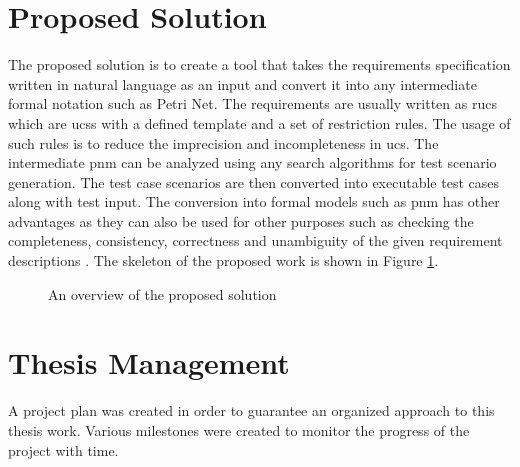 \section{Proposed Solution}
The proposed solution is to create a tool that takes the requirements specification written in natural language as an input and convert it into any intermediate formal notation such as Petri Net. The requirements are usually written as \gls{rucs} which are \glspl{ucs} with a defined template and a set of restriction rules. The usage of such rules is to reduce the imprecision and incompleteness in \gls{ucs}. The intermediate \gls{pnm} can be analyzed using any search algorithms for test scenario generation. The test case scenarios are then converted into executable test cases along with test input. The conversion into formal models such as \gls{pnm} has other advantages as they can also be used for other purposes such as checking the completeness, consistency, correctness and unambiguity of the given requirement descriptions \cite{sarmiento2015analysis}. The skeleton of the proposed work is shown in Figure \ref{fig:proposed_solution}.
\begin{figure}[htb!]
\centering
{}
\caption{An overview of the proposed solution}
\label{fig:proposed_solution}
\end{figure}
\section{Thesis Management}
A project plan was created in order to guarantee an organized approach to this thesis work. Various milestones were created to monitor the progress of the project with time.
